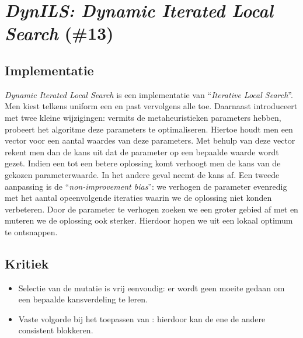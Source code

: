 \section{\emph{DynILS: Dynamic Iterated Local Search} (\#13)}
\label{sss:dyn-ils}
\subsection{Implementatie}
\emph{Dynamic Iterated Local Search}\cite{chesc-dynils,journals/orsnz/ksosils} is een implementatie van ``\emph{Iterative Local Search}''\cite{Lourenco02iteratedlocal}. Men kiest telkens uniform een \abpte{} \abllh{} en past vervolgens alle \abls{} \abhn{} toe. Daarnaast introduceert met twee kleine wijzigingen: vermits de metaheuristieken parameters hebben, probeert het algoritme deze parameters te optimaliseren. Hiertoe houdt men een vector voor een aantal waardes van deze parameters. Met behulp van deze vector rekent men dan de kans uit dat de parameter op een bepaalde waarde wordt gezet. Indien een \abllh{} tot een betere oplossing komt verhoogt men de kans van de gekozen parameterwaarde. In het andere geval neemt de kans af. Een tweede aanpassing is de ``\emph{non-improvement bias}'': we verhogen de parameter evenredig met het aantal opeenvolgende iteraties waarin we de oplossing niet konden verbeteren. Door de parameter te verhogen zoeken we een groter gebied af met \abls{} en muteren we de oplossing ook sterker. Hierdoor hopen we uit een lokaal optimum te ontsnappen.
\subsection{Kritiek}
\begin{itemize}
 \item Selectie van de mutatie is vrij eenvoudig: er wordt geen moeite gedaan om een bepaalde kansverdeling te leren.
 \item Vaste volgorde bij het toepassen van \abls{}: hierdoor kan de ene \abls{} \abh{} de andere consistent blokkeren.
\end{itemize}